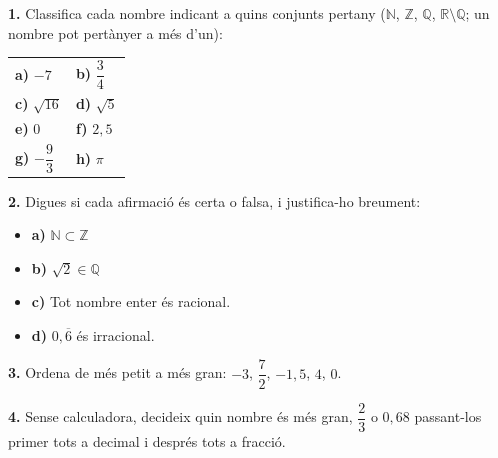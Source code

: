 \documentclass[13pt,a4paper]{extarticle}
\begin{document}
\par\noindent\begin{minipage}{\linewidth}
\textbf{1.} Classifica cada nombre indicant a quins conjunts pertany ($\mathbb{N}$, $\mathbb{Z}$, $\mathbb{Q}$, $\mathbb{R}\setminus\mathbb{Q}$; un nombre pot pertànyer a més d'un):\par

\begin{tabular}{@{}p{.46\linewidth}p{.46\linewidth}@{}}
\textbf{a)} $-7$ & \textbf{b)} $\dfrac{3}{4}$ \\[2pt]
\textbf{c)} $\sqrt{16}$ & \textbf{d)} $\sqrt{5}$ \\[2pt]
\textbf{e)} $0$ & \textbf{f)} $2{,}5$ \\[2pt]
\textbf{g)} $-\dfrac{9}{3}$ & \textbf{h)} $\pi$ \\[2pt]
\end{tabular}\par
\end{minipage}\par\vspace{1.6mm}
\par\noindent\begin{minipage}{\linewidth}
\textbf{2.} Digues si cada afirmació és certa o falsa, i justifica-ho breument:\par

\begin{itemize}[leftmargin=0pt,itemsep=3pt,topsep=3pt,parsep=0pt,label={}]
\item \textbf{a)} $\mathbb{N}\subset\mathbb{Z}$
\item \textbf{b)} $\sqrt{2}\in\mathbb{Q}$
\item \textbf{c)} Tot nombre enter és racional.
\item \textbf{d)} $0{,}\overline{6}$ és irracional.
\end{itemize}
\end{minipage}\par\vspace{1.6mm}
\par\noindent\begin{minipage}{\linewidth}
\textbf{3.} Ordena de més petit a més gran: $-3$, $\dfrac{7}{2}$, $-1{,}5$, $4$, $0$.\par
\end{minipage}\par\vspace{1.6mm}
\par\noindent\begin{minipage}{\linewidth}
\textbf{4.} Sense calculadora, decideix quin nombre és més gran, $\dfrac{2}{3}$ o $0{,}68$ passant-los primer tots a decimal i després tots a fracció.\par
\end{minipage}\par\vspace{1.6mm}
\end{document}

